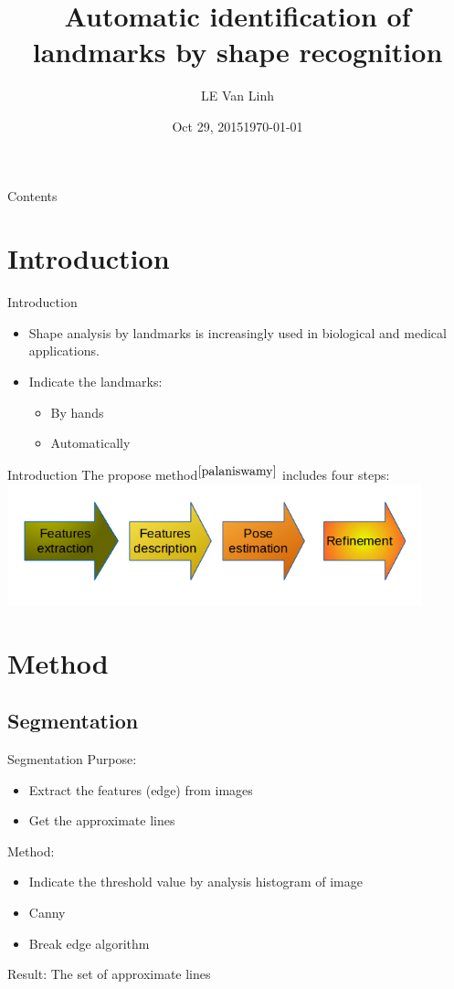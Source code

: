 \documentclass{beamer}
\title{Automatic identification of landmarks by shape recognition}
\author{LE Van Linh}
\date{Oct 29, 2015}
\date{\today}
\begin{document}
\frame{\titlepage}
\begin{frame}{Contents}
	\tableofcontents
\end{frame}
\section{Introduction}
\begin{frame}{Introduction}
	\begin{itemize}
		\item Shape analysis by landmarks is increasingly used in biological and medical applications.
		\item Indicate the landmarks:
			\begin{itemize}
				\item By hands
				\item Automatically
			\end{itemize}			  
	\end{itemize}
\end{frame}
\begin{frame}{Introduction}
	The propose method$^{\cite{palaniswamy}}$ includes four steps:
	\includegraphics[height=3.5cm]{images/flow.png}
\end{frame}
\section{Method}
\subsection{Segmentation}
\begin{frame}{Segmentation}
	Purpose: 
	\begin{itemize}
		\item Extract the features (edge) from images
		\item Get the approximate lines
	\end{itemize}
	Method:
	\begin{itemize}
		\item Indicate the threshold value by analysis histogram of image		
		\item Canny
		\item Break edge algorithm
	\end{itemize}
	Result: The set of approximate lines
\end{frame}
\end{document}

